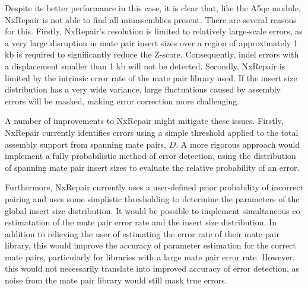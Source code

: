 \documentclass[fleqn,10pt]{wlpeerj}
\begin{document}
Despite its better performance in this case, it is clear that, like the A5qc module, NxRepair is not able to find all misassemblies present. There are several reasons for this. Firstly, NxRepair's resolution is limited to relatively large-scale errors, as a very large disruption in mate pair insert sizes over a region of approximately 1 kb is required to significantly reduce the Z-score. Consequently, indel errors with a displacement smaller than 1 kb will not be detected. Secondly, NxRepair is limited by the intrinsic error rate of the mate pair library used. If the insert size distribution has a very wide variance, large fluctuations caused by assembly errors will be masked, making error correction more challenging. 

A number of improvements to NxRepair might mitigate these issues. Firstly, NxRepair currently identifies errors using a simple threshold applied to the total assembly support from spanning mate pairs, $D$. A more rigorous approach would implement a fully probabilistic method of error detection, using the distribution of spanning mate pair insert sizes to evaluate the relative probability of an error. 

Furthermore, NxRepair currently uses a user-defined prior probability of incorrect pairing and uses some simplistic thresholding to determine the parameters of the global insert size distribution. It would be possible to implement simultaneous co-estimatation of the mate pair error rate and the insert size distribution. In addition to relieving the user of estimating the error rate of their mate pair library, this would improve the accuracy of parameter estimation for the correct mate pairs, particularly for libraries with a large mate pair error rate. However, this would not necessarily translate into improved accuracy of error detection, as noise from the mate pair library would still mask true errors.        
\end{document}
